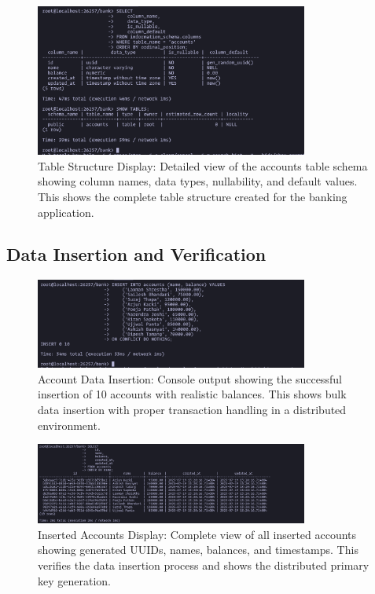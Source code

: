 \begin{figure}[H]
  \centering
  \includegraphics[width=0.8\textwidth]{task-5/screenshots/table-structure.png}
  \caption{Table Structure Display: Detailed view of the accounts table schema showing column names, data types, nullability, and default values. This shows the complete table structure created for the banking application.}
  \label{fig:task5-table-structure}
\end{figure}

\subsection*{Data Insertion and Verification}

\begin{figure}[H]
  \centering
  \includegraphics[width=0.8\textwidth]{task-5/screenshots/insert-balance.png}
  \caption{Account Data Insertion: Console output showing the successful insertion of 10 accounts with realistic balances. This shows bulk data insertion with proper transaction handling in a distributed environment.}
  \label{fig:task5-insert-balance}
\end{figure}

\begin{figure}[H]
  \centering
  \includegraphics[width=0.8\textwidth]{task-5/screenshots/display-inserted-data.png}
  \caption{Inserted Accounts Display: Complete view of all inserted accounts showing generated UUIDs, names, balances, and timestamps. This verifies the data insertion process and shows the distributed primary key generation.}
  \label{fig:task5-display-inserted}
\end{figure}

